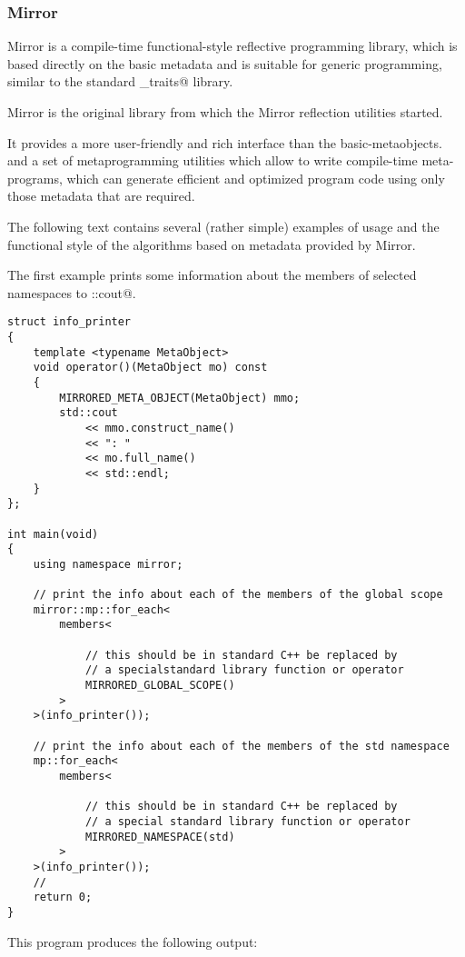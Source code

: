 \subsubsection{Mirror}

Mirror is a compile-time functional-style reflective programming library,
which is based directly on the basic metadata and is suitable for generic programming,
similar to the standard \verb@type_traits@ library.

Mirror is the original library from which the Mirror reflection utilities started.

It provides a more user-friendly and rich interface than the basic-metaobjects.
and a set of metaprogramming utilities which allow
to write compile-time meta-programs, which can generate efficient
and optimized program code using only those metadata that are required.

The following text contains several (rather simple) examples of usage
and the functional style of the algorithms based on metadata provided by Mirror.

The first example prints some information about the members of selected
namespaces to \verb@std::cout@.

\begin{lstlisting}
struct info_printer
{
    template <typename MetaObject>
    void operator()(MetaObject mo) const
    {
        MIRRORED_META_OBJECT(MetaObject) mmo;
        std::cout
            << mmo.construct_name()
            << ": "
            << mo.full_name()
            << std::endl;
    }
};

int main(void)
{
    using namespace mirror;

    // print the info about each of the members of the global scope
    mirror::mp::for_each<
        members<

            // this should be in standard C++ be replaced by 
            // a specialstandard library function or operator
            MIRRORED_GLOBAL_SCOPE()
        >
    >(info_printer());

    // print the info about each of the members of the std namespace
    mp::for_each<
        members<

            // this should be in standard C++ be replaced by
            // a special standard library function or operator
            MIRRORED_NAMESPACE(std)
        >
    >(info_printer());
    //
    return 0;
}
\end{lstlisting}

This program produces the following output:


